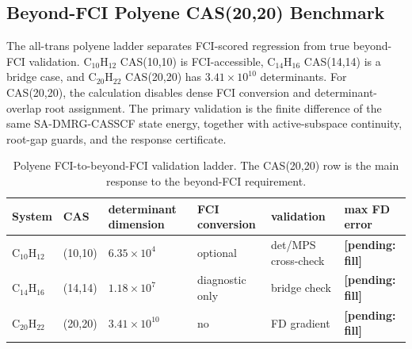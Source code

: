 \documentclass[journal=jctcce,manuscript=article]{achemso}
\newcommand{\pending}[1]{\textbf{[pending: #1]}}
\begin{document}
\subsection{Beyond-FCI Polyene CAS(20,20) Benchmark}
The all-trans polyene ladder separates FCI-scored regression from true beyond-FCI validation.
C$_{10}$H$_{12}$ CAS(10,10) is FCI-accessible, C$_{14}$H$_{16}$ CAS(14,14) is a bridge case, and C$_{20}$H$_{22}$ CAS(20,20) has $3.41\times10^{10}$ determinants.
For CAS(20,20), the calculation disables dense FCI conversion and determinant-overlap root assignment.
The primary validation is the finite difference of the same SA-DMRG-CASSCF state energy, together with active-subspace continuity, root-gap guards, and the response certificate.

\begin{table}[t]
\centering
\scriptsize
\caption{Polyene FCI-to-beyond-FCI validation ladder.  The CAS(20,20) row is the main response to the beyond-FCI requirement.}
\label{tab:polyene-beyond-fci}
\begin{tabular}{P{0.16\textwidth}P{0.14\textwidth}P{0.18\textwidth}P{0.11\textwidth}P{0.15\textwidth}P{0.17\textwidth}}
\toprule
System & CAS & determinant dimension & FCI conversion & validation & max FD error \\
\midrule
C$_{10}$H$_{12}$ & (10,10) & $6.35\times10^{4}$ & optional & det/MPS cross-check & \pending{fill} \\
C$_{14}$H$_{16}$ & (14,14) & $1.18\times10^{7}$ & diagnostic only & bridge check & \pending{fill} \\
C$_{20}$H$_{22}$ & (20,20) & $3.41\times10^{10}$ & no & FD gradient & \pending{fill} \\
\bottomrule
\end{tabular}
\end{table}
\end{document}
